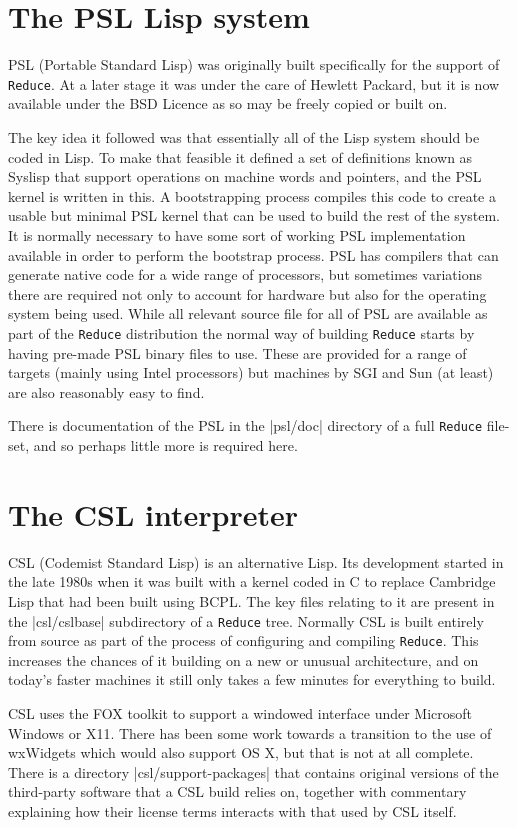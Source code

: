 \documentclass[12pt,twoside,openright]{memoir}
\newcommand{\reduce}{\texttt{Reduce}\xspace}
\begin{document}
\section{The PSL Lisp system}
PSL (Portable Standard Lisp) was originally built specifically for the
support of \reduce. At a later stage it was under the care of Hewlett Packard,
but it is now available under the BSD Licence as so may be freely copied
or built on.

The key idea it followed was that essentially all of the
Lisp system should be coded in Lisp. To make that feasible it defined a
set of definitions known as Syslisp that support operations on machine
words and pointers, and the PSL kernel is written in this. A bootstrapping
process compiles this code to create a usable but minimal PSL kernel
that can be used to build the rest of the system. It is normally necessary
to have some sort of working PSL implementation available in order to
perform the bootstrap process. PSL has compilers that can generate native
code for a wide range of processors, but sometimes variations there are
required not only to account for hardware but also for the operating
system being used. While all relevant source file for all of PSL are
available as part of the \reduce distribution the normal way of building
\reduce starts by having pre-made PSL binary files to use. These are
provided for a range of targets (mainly using Intel processors) but
machines by SGI and Sun (at least) are also reasonably easy to find.

There is documentation of the PSL in the |psl/doc| directory
of a full \reduce file-set, and so perhaps little more is required here.

\section{The CSL interpreter}
\label{sec:csl-interpreter}
CSL (Codemist Standard Lisp) is an alternative Lisp. Its development
started in the late 1980s when it was built with a kernel coded in C to
replace Cambridge Lisp that had been built using BCPL. The key files
relating to it are present in the |csl/cslbase| subdirectory of a \reduce
tree. Normally CSL is built entirely from source as part of the process of
configuring and compiling \reduce. This increases the chances of it building
on a new or unusual architecture, and on today's faster machines it still
only takes a few minutes for everything to build.

CSL uses the FOX toolkit to support a windowed interface under Microsoft
Windows or X11. There has been some work towards a transition to the
use of wxWidgets which would also support OS X, but that is not at all
complete. There is a directory |csl/support-packages| that contains
original versions of the third-party software that a CSL build relies on,
together with commentary explaining how their license terms interacts
with that used by CSL itself.
\end{document}
